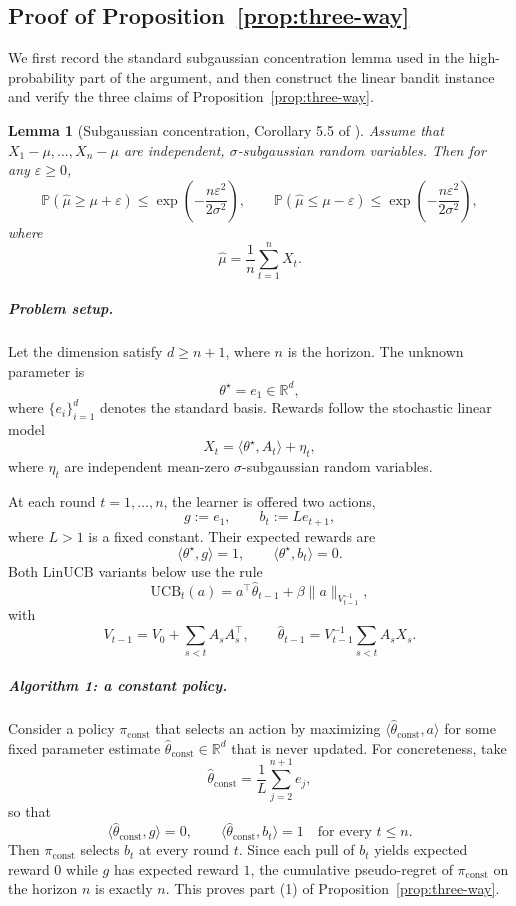 \documentclass{article}
\newtheorem{lemma}{Lemma}
\theoremstyle{definition}
\theoremstyle{remark}
\theoremstyle{remark}
\begin{document}
\subsection{Proof of Proposition~\ref{prop:three-way}}
\label{app:proof-three-way}

We first record the standard subgaussian concentration lemma used in the
high-probability part of the argument, and then construct the linear bandit
instance and verify the three claims of Proposition~\ref{prop:three-way}.

\begin{lemma}[Subgaussian concentration, Corollary 5.5 of \cite{lattimore2020bandit}]
\label{lem:subgaussian}
Assume that $X_1-\mu,\dots,X_n-\mu$ are independent, $\sigma$-subgaussian random variables. Then for any $\varepsilon \ge 0$,
\[
\mathbb{P}\!\left(\hat{\mu} \ge \mu+\varepsilon\right)
\le
\exp\!\left(-\frac{n\varepsilon^2}{2\sigma^2}\right),
\qquad
\mathbb{P}\!\left(\hat{\mu} \le \mu-\varepsilon\right)
\le
\exp\!\left(-\frac{n\varepsilon^2}{2\sigma^2}\right),
\]
where
\[
\hat{\mu}=\frac{1}{n}\sum_{t=1}^n X_t.
\]
\end{lemma}

\subparagraph{Problem setup.}
Let the dimension satisfy $d \ge n+1$, where $n$ is the horizon. The unknown parameter is
\[
\theta^\star = e_1 \in \mathbb{R}^d,
\]
where $\{e_i\}_{i=1}^d$ denotes the standard basis. Rewards follow the stochastic linear model
\[
X_t = \langle \theta^\star, A_t \rangle + \eta_t,
\]
where $\eta_t$ are independent mean-zero $\sigma$-subgaussian random variables.

At each round $t=1,\dots,n$, the learner is offered two actions,
\[
g:=e_1,
\qquad
b_t:=L e_{t+1},
\]
where $L>1$ is a fixed constant. Their expected rewards are
\[
\langle \theta^\star,g\rangle = 1,
\qquad
\langle \theta^\star,b_t\rangle = 0.
\]
Both LinUCB variants below use the rule
\[
\mathrm{UCB}_t(a)
=
a^\top \hat{\theta}_{t-1}
+
\beta \|a\|_{V_{t-1}^{-1}},
\]
with
\[
V_{t-1}=V_0+\sum_{s<t} A_sA_s^\top,
\qquad
\hat{\theta}_{t-1}
=
V_{t-1}^{-1}\sum_{s<t} A_s X_s.
\]

\subparagraph{Algorithm 1: a constant policy.}
Consider a policy $\pi_{\mathrm{const}}$ that selects an action by maximizing $\langle \hat{\theta}_{\mathrm{const}}, a\rangle$ for some fixed parameter estimate $\hat{\theta}_{\mathrm{const}}\in\mathbb{R}^d$ that is never updated. For concreteness, take
\[
\hat{\theta}_{\mathrm{const}}
=
\frac{1}{L}\sum_{j=2}^{n+1} e_j,
\]
so that
\[
\langle \hat{\theta}_{\mathrm{const}},g\rangle = 0,
\qquad
\langle \hat{\theta}_{\mathrm{const}},b_t\rangle = 1
\quad\text{for every } t\le n.
\]
Then $\pi_{\mathrm{const}}$ selects $b_t$ at every round $t$. Since each pull of $b_t$ yields expected reward $0$ while $g$ has expected reward $1$, the cumulative pseudo-regret of $\pi_{\mathrm{const}}$ on the horizon $n$ is exactly $n$. This proves part (1) of Proposition~\ref{prop:three-way}.
\end{document}
